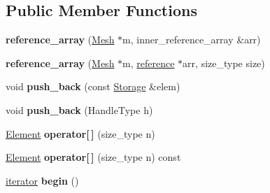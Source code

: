 \subsection*{Public Member Functions}
\begin{DoxyCompactItemize}
\item 
\hypertarget{classINMOST_1_1Storage_1_1reference__array_a4e01c7df6cdb5b59ae3212c384d9851b}{{\bfseries reference\-\_\-array} (\hyperlink{classINMOST_1_1Mesh}{Mesh} $\ast$m, inner\-\_\-reference\-\_\-array \&arr)}\label{classINMOST_1_1Storage_1_1reference__array_a4e01c7df6cdb5b59ae3212c384d9851b}

\item 
\hypertarget{classINMOST_1_1Storage_1_1reference__array_a2baea5e3b0592b79555788a468216623}{{\bfseries reference\-\_\-array} (\hyperlink{classINMOST_1_1Mesh}{Mesh} $\ast$m, \hyperlink{classINMOST_1_1Storage_a8674802045ec170a3c9d0e3281545b54}{reference} $\ast$arr, size\-\_\-type size)}\label{classINMOST_1_1Storage_1_1reference__array_a2baea5e3b0592b79555788a468216623}

\item 
\hypertarget{classINMOST_1_1Storage_1_1reference__array_a1e023416b73f1ff803b8dea5d2a9dcc0}{void {\bfseries push\-\_\-back} (const \hyperlink{classINMOST_1_1Storage}{Storage} \&elem)}\label{classINMOST_1_1Storage_1_1reference__array_a1e023416b73f1ff803b8dea5d2a9dcc0}

\item 
\hypertarget{classINMOST_1_1Storage_1_1reference__array_aff2da30cdc5284d11aea62b37964f34f}{void {\bfseries push\-\_\-back} (Handle\-Type h)}\label{classINMOST_1_1Storage_1_1reference__array_aff2da30cdc5284d11aea62b37964f34f}

\item 
\hypertarget{classINMOST_1_1Storage_1_1reference__array_a5ab5d6fab497a337926c16a46e5a58ee}{\hyperlink{classINMOST_1_1Element}{Element} {\bfseries operator\mbox{[}$\,$\mbox{]}} (size\-\_\-type n)}\label{classINMOST_1_1Storage_1_1reference__array_a5ab5d6fab497a337926c16a46e5a58ee}

\item 
\hypertarget{classINMOST_1_1Storage_1_1reference__array_aa39ff3355bc37bfab5e2ec7cca938aa6}{\hyperlink{classINMOST_1_1Element}{Element} {\bfseries operator\mbox{[}$\,$\mbox{]}} (size\-\_\-type n) const }\label{classINMOST_1_1Storage_1_1reference__array_aa39ff3355bc37bfab5e2ec7cca938aa6}

\item 
\hypertarget{classINMOST_1_1Storage_1_1reference__array_ab7b643e070fdfdf3a34eb83e0e41f1f4}{\hyperlink{classINMOST_1_1Storage_1_1reference__array_1_1iterator}{iterator} {\bfseries begin} ()}\label{classINMOST_1_1Storage_1_1reference__array_ab7b643e070fdfdf3a34eb83e0e41f1f4}


\end{DoxyCompactItemize}
